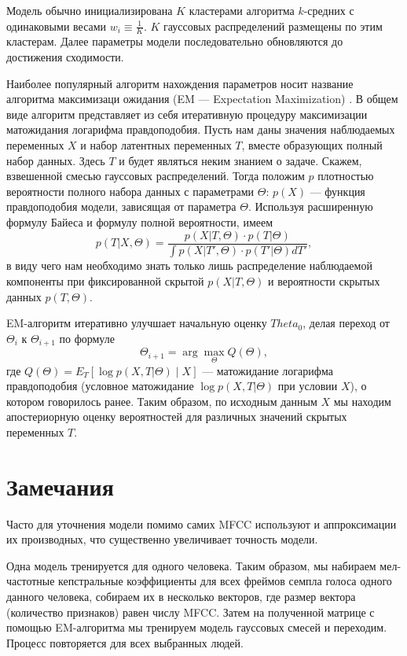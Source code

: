 \documentclass[12pt]{gost-7-32}
\begin{document}
Модель обычно инициализирована $K$ кластерами алгоритма $k$-средних с одинаковыми весами $w_i \equiv \frac{1}{K}$.
$K$ гауссовых распределений размещены по этим кластерам.
Далее параметры модели последовательно обновляются до достижения сходимости.

Наиболее популярный алгоритм нахождения параметров носит название алгоритма максимизаци ожидания (EM --- Expectation Maximization) \cite{em_new}.
В общем виде алгоритм представляет из себя итеративную процедуру максимизации матожидания логарифма правдоподобия.
Пусть нам даны значения наблюдаемых переменных $X$ и набор латентных переменных $T$, вместе образующих полный набор данных.
Здесь $T$ и будет являться неким знанием о задаче.
Скажем, взвешенной смесью гауссовых распределений.
Тогда положим $p$ плотностью вероятности полного набора данных с параметрами $\Theta$: $p(X)$ --- функция правдоподобия модели, зависящая от параметра $\Theta$.
Используя расширенную формулу Байеса и формулу полной вероятности, имеем
\begin{equation}
    p(T | X, \Theta) = \frac{p(X | T, \Theta) \cdot p(T | \Theta)}{\int p(X | T', \Theta) \cdot p(T' | \Theta) d T'},
\end{equation}
в виду чего нам необходимо знать только лишь распределение наблюдаемой компоненты при фиксированной скрытой $p(X | T, \Theta)$ и вероятности скрытых данных $p(T, \Theta)$.

EM-алгоритм итеративно улучшает начальную оценку $Theta_0$, делая переход от $\Theta_i$ к $\Theta_{i + 1}$ по формуле
\begin{equation}
    \Theta_{i + 1} = \arg \max_\Theta Q(\Theta),
\end{equation}
где $Q(\Theta) = E_T \left[ \log p(X, T | \Theta) \mid X \right]$ --- матожидание логарифма правдоподобия (условное матожидание $\log p(X, T | \Theta)$ при условии $X$), о котором говорилось ранее.
Таким образом, по исходным данным $X$ мы находим апостериорную оценку вероятностей для различных значений скрытых переменных $T$.

\section{Замечания}

Часто для уточнения модели помимо самих MFCC используют и аппроксимации их производных, что существенно увеличивает точность модели.

Одна модель тренируется для одного человека.
Таким образом, мы набираем мел-частотные кепстральные коэффициенты для всех фреймов семпла голоса одного данного человека, собираем их в несколько векторов, где размер вектора (количество признаков) равен числу MFCC.
Затем на полученной матрице с помощью EM-алгоритма мы тренируем модель гауссовых смесей и переходим.
Процесс повторяется для всех выбранных людей.
\end{document}

